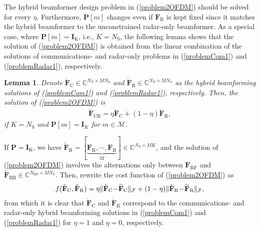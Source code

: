 \documentclass[journal,10pt]{IEEEtran}
\newtheorem{lemma}[theorem]{Lemma}
\begin{document}
	
	
	The hybrid beamformer design problem in (\ref{problem2OFDM}) should be solved for every $\eta$. Furthermore,  $\mathbf{P}[m]$ changes even if $\mathbf{F}_\mathrm{R}$ is kept fixed since it matches the hybrid beamformer to the unconstrained radar-only beamformer. As a special case, where $\mathbf{P}[m] = \mathbf{I}_\mathrm{K}$, i.e., $K= N_\mathrm{S}$, the following lemma shows that the solution of (\ref{problem2OFDM}) is obtained from the linear combination of the solutions of communications- and radar-only problems in (\ref{problemCom1}) and (\ref{problemRadar1}), respectively.
	
	{\color{black}
		\begin{lemma}
			\label{lem:sol2} Denote $\check{\mathbf{F}}_\mathrm{C}\in \mathbb{C}^{N_\mathrm{T}\times MN_\mathrm{S}}$ and $\check{\mathbf{F}}_\mathrm{R}\in \mathbb{C}^{N_\mathrm{T}\times MN_\mathrm{S}}$ as the hybrid beamforming solutions of  (\ref{problemCom1}) and (\ref{problemRadar1}), respectively. Then, the solution of (\ref{problem2OFDM}) is 
			\begin{align}
			\label{lemma2Claim}
			\check{\mathbf{F}}_\mathrm{CR} = \eta \check{\mathbf{F}}_\mathrm{C} + (1 - \eta)\check{\mathbf{F}}_\mathrm{R},
			\end{align}
			if $K= N_\mathrm{S}$ and $\mathbf{P}[m]=\mathbf{I}_K$ for $m\in \mathcal{M}$.
		\end{lemma}
		\begin{IEEEproof} If $\mathbf{P}= \mathbf{I}_\mathrm{K}$, we have $\widetilde{\mathbf{F}}_\mathrm{R} =[ \underbrace{\mathbf{F}_\mathrm{R},\cdots, \mathbf{F}_\mathrm{R}}_{M}]\in \mathbb{C}^{N_\mathrm{T}\times MK}$, and  the solution of (\ref{problem2OFDM}) involves the alternations only between $\mathbf{F}_\mathrm{RF}$ and $\widetilde{\mathbf{F}}_\mathrm{BB}\in \mathbb{C}^{N_\mathrm{RF}\times MN_\mathrm{S}}$. Then, rewrite the cost function of (\ref{problem2OFDM}) as
			\begin{align}
			\label{lemmaCost1}
			f(\check{\mathbf{F}}_\mathrm{C},\check{\mathbf{F}}_\mathrm{R}) =\eta \|\check{\mathbf{F}}_\mathrm{C} \hspace{-2pt} - \hspace{-2pt} \widetilde{\mathbf{F}}_\mathrm{C}\|_\mathcal{F}  +(1 - \eta)\|\check{\mathbf{F}}_\mathrm{R}\hspace{-2pt}  - \hspace{-2pt} \widetilde{\mathbf{F}}_\mathrm{R}\|_\mathcal{F}, 
			\end{align}
			from which it is clear that $\check{\mathbf{F}}_\mathrm{C}$ and $\check{\mathbf{F}}_\mathrm{R}$ correspond to the communications- and radar-only hybrid beamforming solutions in (\ref{problemCom1}) and (\ref{problemRadar1}) for $\eta = 1$ and $\eta = 0$, respectively. 

\end{IEEEproof}}
\end{document}

